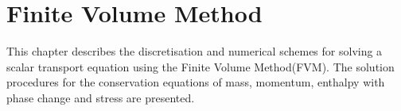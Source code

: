 
\chapter{Finite Volume Method}

This chapter describes the discretisation and
numerical schemes for solving a  scalar transport equation using
the Finite Volume Method(FVM).
The solution procedures for the conservation equations of mass,
momentum, enthalpy with phase change and stress are presented.






